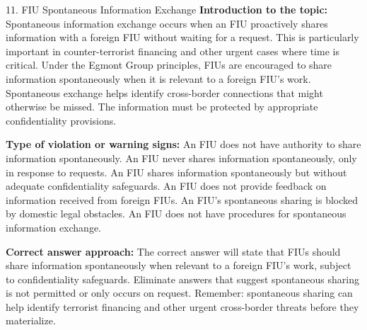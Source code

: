 \documentclass[11pt,a4paper]{beamer}
\begin{document}
\begin{frame}{11. FIU Spontaneous Information Exchange}
\tiny
\noindent\textbf{Introduction to the topic:} Spontaneous information exchange occurs when an FIU proactively shares information with a foreign FIU without waiting for a request. This is particularly important in counter-terrorist financing and other urgent cases where time is critical. Under the Egmont Group principles, FIUs are encouraged to share information spontaneously when it is relevant to a foreign FIU's work. Spontaneous exchange helps identify cross-border connections that might otherwise be missed. The information must be protected by appropriate confidentiality provisions.

\vspace{0.1cm}
\noindent\textbf{Type of violation or warning signs:} An FIU does not have authority to share information spontaneously. An FIU never shares information spontaneously, only in response to requests. An FIU shares information spontaneously but without adequate confidentiality safeguards. An FIU does not provide feedback on information received from foreign FIUs. An FIU's spontaneous sharing is blocked by domestic legal obstacles. An FIU does not have procedures for spontaneous information exchange.

\vspace{0.1cm}
\noindent\textbf{Correct answer approach:} The correct answer will state that FIUs should share information spontaneously when relevant to a foreign FIU's work, subject to confidentiality safeguards. Eliminate answers that suggest spontaneous sharing is not permitted or only occurs on request. Remember: spontaneous sharing can help identify terrorist financing and other urgent cross-border threats before they materialize.
\end{frame}
\end{document}
